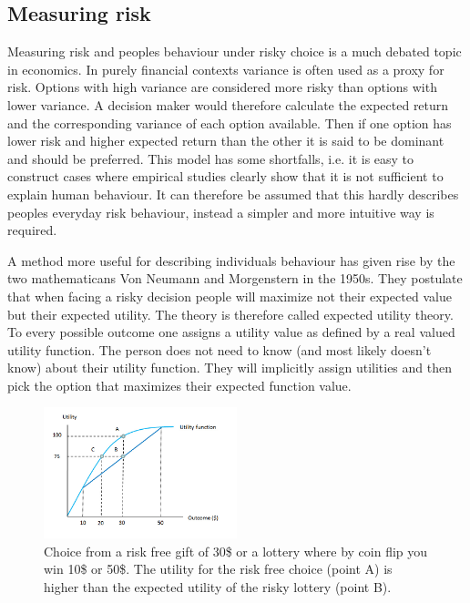 \subsection{Measuring risk}

Measuring risk and peoples behaviour under risky choice is a much debated topic in economics. In purely financial contexts variance is often used as a proxy for risk. Options with high variance are considered more risky than options with lower variance. 
A decision maker would therefore calculate the expected return and the corresponding variance of each option available.
Then if one option has lower risk and higher expected return than the other it is said to be dominant and should be preferred.
This model has some shortfalls, i.e. it is easy to construct cases where empirical studies clearly show that it is not sufficient to explain human behaviour.
It can therefore be assumed that this hardly describes peoples everyday risk behaviour, instead a simpler and more intuitive way is required. \cite{Jaeger00}

A method more useful for describing individuals behaviour has given rise by the two mathematicans Von Neumann and Morgenstern in the 1950s. They postulate that when facing a risky decision people will maximize not their expected value but their expected utility. \cite{Morgenstern53}
The theory is therefore called expected utility theory.
To every possible outcome one assigns a utility value as defined by a real valued utility function. The person does not need to know (and most likely doesn't know) about their utility function. They will implicitly assign utilities and then pick the option that maximizes their expected function value.


\begin{figure}[ht]
\centering
\includegraphics[width=0.5\textwidth]{img/background/riskaversion}%
\caption{Choice from a risk free gift of 30\$ or a lottery where by coin flip you win 10\$ or 50\$. The utility for the risk free choice (point A) is higher than the expected utility of the risky lottery (point B). 
}
\label{fig:background:riskaversion}
\end{figure}


